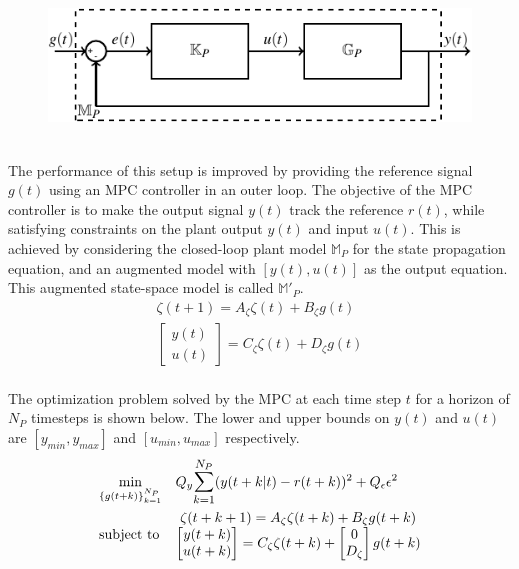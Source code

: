 \documentclass[letterpaper, 10 pt, conference]{ieeeconf}  %
\begin{document}
\begin{enumerate}
\begin{figure}[h]
	\includegraphics{KpGp.pdf}
	\end{figure}
	\\
	The performance of this setup is improved by providing the reference signal $g(t)$ using an MPC controller in an outer loop. The objective of the MPC controller is to make the output signal $y(t)$ track the reference $r(t)$, while satisfying constraints on the plant output $y(t)$ and input $u(t)$. This is achieved by considering the closed-loop plant model $\mathbb{M}_P$ for the state propagation equation, and an augmented model with $[y(t),u(t)]$ as the output equation. This augmented state-space model is called $\mathbb{M}'_P$.
	\begin{equation*}
	\begin{matrix}
	\zeta(t+1) = A_\zeta\zeta(t) + B_\zeta g(t)\\
	\begin{bmatrix}y(t)\\u(t)\end{bmatrix} = C_\zeta\zeta(t) + D_\zeta g(t)
	\end{matrix}
	\end{equation*}
	\\
	The optimization problem solved by the MPC at each time step $t$ for a horizon of $N_P$ timesteps is shown below. The lower and upper bounds on $y(t)$ and $u(t)$ are $[y_{min},y_{max}]$ and $[u_{min},u_{max}]$ respectively.
	\begin{equation}
	\begin{aligned}
	& \underset{\{g(t+k)\}_{k=1}^{N_P}}{\text{min}}
	& & Q_y\mathlarger{\sum\limits_{k=1}^{N_P}}(y(t+k|t)-r(t+k))^2 + Q_{\epsilon}\epsilon^2 \\
	& \text{subject to}
	& & 
	\begin{matrix}
	\zeta(t+k+1) = A_\zeta\zeta(t+k) + B_\zeta g(t+k)\\
	\begin{bmatrix}y(t+k)\\u(t+k)\end{bmatrix} = C_\zeta\zeta(t+k) + \begin{bmatrix}0\\D_\zeta\end{bmatrix}g(t+k)\\

\end{matrix}
\end{aligned}
\end{equation}
\end{enumerate}
\end{document}
